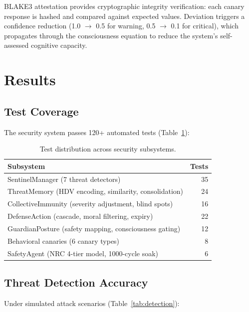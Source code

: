 \documentclass[11pt,a4paper]{article}
\begin{document}
BLAKE3 attestation provides cryptographic integrity verification: each canary response is hashed and compared against expected values. Deviation triggers a confidence reduction (1.0 $\to$ 0.5 for warning, 0.5 $\to$ 0.1 for critical), which propagates through the consciousness equation to reduce the system's self-assessed cognitive capacity.

\section{Results}

\subsection{Test Coverage}

The security system passes 120+ automated tests (Table~\ref{tab:security_tests}):

\begin{table}[h]
\centering
\caption{Test distribution across security subsystems.}
\label{tab:security_tests}
\begin{tabular}{lr}
\toprule
\textbf{Subsystem} & \textbf{Tests} \\
\midrule
SentinelManager (7 threat detectors) & 35 \\
ThreatMemory (HDV encoding, similarity, consolidation) & 24 \\
CollectiveImmunity (severity adjustment, blind spots) & 16 \\
DefenseAction (cascade, moral filtering, expiry) & 22 \\
GuardianPosture (safety mapping, consciousness gating) & 12 \\
Behavioral canaries (6 canary types) & 8 \\
SafetyAgent (NRC 4-tier model, 1000-cycle soak) & 6 \\
\bottomrule
\end{tabular}
\end{table}

\subsection{Threat Detection Accuracy}

Under simulated attack scenarios (Table~\ref{tab:detection}):
\end{document}
